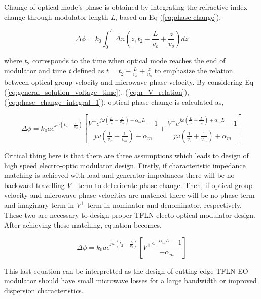 \documentclass[thesis]{deutez}
\begin{document}
	Change of optical mode's phase is obtained by integrating the refractive index change through modulator length \textit{L}, based on Eq (\ref{eq:phase-change}),

    \begin{equation}
        \Delta \phi = k_0 \int_0^L \Delta n(z,t_2-\frac{L}{v_{o}}+\frac{z}{ v_{o}}) dz
        \label{eq:phase_change_integral_1}
    \end{equation}    
    
    where $t_2$ corresponds to the time when optical mode reaches the end of modulator and time \textit{t} defined as $ t =t_2-\frac{L}{v_{o}}+\frac{z}{ v_{o}}$ to emphasize the relation between optical group velocity and microwave phase velocity. By considering Eq (\ref{eq:general_solution_voltage_time}), (\ref{eq:n_V_relation}), (\ref{eq:phase_change_integral_1}), optical phase change is calculated as,
    
    \begin{equation}
        \Delta \phi= k_0 a e^{j\omega \left(t_2 - \frac{L}{v_o}\right)} \left[ \frac{V^+ e^{j\omega \left(\frac{L}{v_o} - \frac{L}{v_m}\right) - \alpha_m L} - 1}{j\omega \left(\frac{1}{v_o} - \frac{1}{v_m}\right) - \alpha_m}+\frac{V^- e^{j\omega \left(\frac{L}{v_o} + \frac{L}{v_m}\right) + \alpha_m L} - 1}{j\omega \left(\frac{1}{v_o} + \frac{1}{v_m}\right) + \alpha_m}\right]
    \end{equation}
    
	Critical thing here is that there are three assumptions which leads to design of high speed electro-optic modulator design. Firstly, if characteristic impedance matching is achieved with load and generator impedances there will be no backward travelling $V^-$ term to deteriorate phase change. Then, if optical group velocity and microwave phase velocities are matched there will be no phase term and imaginary term in $V^+$ term in nominator and denominator, respectively. These two are necessary to design proper TFLN electo-optical modulator design. After achieving these matching, equation becomes,

    \begin{equation}
        \Delta \phi = k_0 a e^{j\omega \left(t_2 - \frac{L}{v_o}\right)}\left[ V^+ \frac{e^{- \alpha_m L}-1}{- \alpha_m}  \right]
        \label{eq:phase_change_microwave_loss_dependent_term}
    \end{equation}

    This last equation can be interpretted as the design of cutting-edge TFLN EO modulator should have small microwave losses for a large bandwidth or improved dispersion characteristics.    
    
\end{document}
